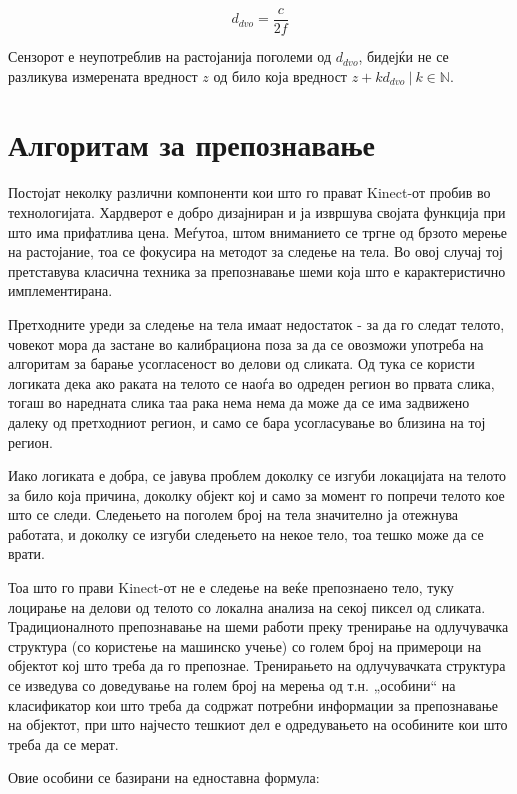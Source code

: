 \documentclass[12pt]{article}
\begin{document}
		$$ d_{dvo} = \frac{c}{2f} $$

		Сензорот е неупотреблив на растојанија поголеми од $d_{dvo}$, бидејќи не се разликува измерената вредност $z$ од било која вредност $z + k d_{dvo}\ | \ k \in \mathbb{N}$.

\newpage

\section{Алгоритам за препознавање}

  Постојат неколку различни компоненти кои што го прават Kinect-от пробив во технологијата. Хардверот е добро дизајниран и ја извршува својата функција при што има прифатлива цена. Меѓутоа, штом вниманието се тргне од брзото мерење на растојание, тоа се фокусира на методот за следење на тела. Во овој случај тој претставува класична техника за препознавање шеми која што е карактеристично имплементирана.\bigbreak

	Претходните уреди за следење на тела имаат недостаток - за да го следат телото, човекот мора да застане во калибрациона поза за да се овозможи употреба на алгоритам за барање усогласеност во делови од сликата. Од тука се користи логиката дека ако раката на телото се наоѓа во одреден регион во првата слика, тогаш во наредната слика таа рака нема нема да може да се има задвижено далеку од претходниот регион, и само се бара усогласување во близина на тој регион.\bigbreak

	Иако логиката е добра, се јавува проблем доколку се изгуби локацијата на телото за било која причина, доколку објект кој и само за момент го попречи телото кое што се следи. Следењето на поголем број на тела значително ја отежнува работата, и доколку се изгуби следењето на некое тело, тоа тешко може да се врати.\bigbreak

	Тоа што го прави Kinect-от не е следење на веќе препознаено тело, туку лоцирање на делови од телото со локална анализа на секој пиксел од сликата. Традиционалното препознавање на шеми работи преку тренирање на одлучувачка структура (со користење на машинско учење) со голем број на примероци на објектот кој што треба да го препознае. Тренирањето на одлучувачката структура се изведува со доведување на голем број на мерења од т.н. „особини“ на класификатор кои што треба да содржат потребни информации за препознавање на објектот, при што најчесто тешкиот дел е одредувањето на особините кои што треба да се мерат.\bigbreak

	Овие особини се базирани на едноставна формула:
\end{document}

